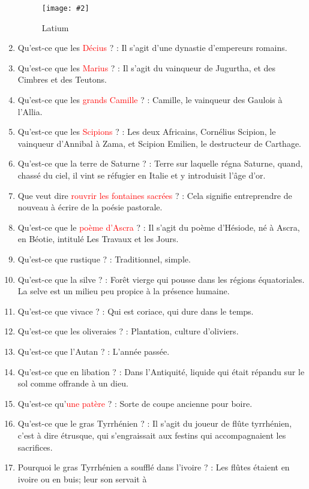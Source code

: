 \documentclass[a4paper, 11pt, hidelinks]{article}
\newcommand{\img}[4]{\begin{figure}[!ht]
    \centering
    \texttt{[image: \#2]}
    \caption{#3}
    \label{#4}
    \end{figure} }
\begin{document}
\begin{enumerate}
            \img{0.3}{Latium.png}{Latium}{86}
      \item Qu'est-ce que les \textcolor{red}{Décius} ? : Il s'agit d'une dynastie d'empereurs romains.
      \item Qu'est-ce que les \textcolor{red}{Marius} ? : Il s'agit du vainqueur de Jugurtha, et des Cimbres et des Teutons.
      \item Qu'est-ce que les \textcolor{red}{grands Camille} ? : Camille, le vainqueur des Gaulois à l'Allia.
      \item Qu'est-ce que les \textcolor{red}{Scipions} ? : Les deux Africains, Cornélius Scipion, le vainqueur d'Annibal à Zama, et Scipion Emilien,
            le destructeur de Carthage.
      \item Qu'est-ce que la terre de Saturne ? : Terre sur laquelle régna Saturne, quand, chassé du ciel, il vint se réfugier
            en Italie et y introduisit l'âge d'or.
      \item Que veut dire \textcolor{red}{rouvrir les fontaines sacrées} ? : Cela signifie entreprendre de nouveau à écrire de la poésie pastorale.
      \item Qu'est-ce que le \textcolor{red}{poème d'Ascra} ? : Il s'agit du poème d'Hésiode, né à Ascra, en Béotie, intitulé Les Travaux et les Jours.
      \item Qu'est-ce que rustique ? : Traditionnel, simple.
      \item Qu'est-ce que la silve ? : Forêt vierge qui pousse dans les régions équatoriales. La selve est un milieu peu propice à la présence humaine.
      \item Qu'est-ce que vivace ? : Qui est coriace, qui dure dans le temps.
      \item Qu'est-ce que les oliveraies ? : Plantation, culture d'oliviers.
      \item Qu'est-ce que l'Autan ? : L'année passée.
      \item Qu'est-ce que en libation ? : Dans l'Antiquité, liquide qui était répandu sur le sol comme offrande à un dieu.
      \item Qu'est-ce qu'\textcolor{red}{une patère} ? : Sorte de coupe ancienne pour boire.
      \item Qu'est-ce que le gras Tyrrhénien ? : Il s'agit du joueur de flûte tyrrhénien, c'est à dire étrusque, qui s'engraissait aux
            festins qui accompagnaient les sacrifices.
      \item Pourquoi le gras Tyrrhénien a soufflé dans l'ivoire ? : Les flûtes étaient en ivoire ou en buis; leur son servait à

\end{enumerate}
\end{document}
